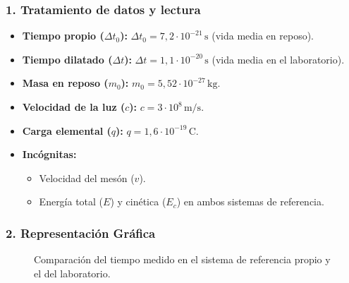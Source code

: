 \subsubsection*{1. Tratamiento de datos y lectura}
\begin{itemize}
    \item \textbf{Tiempo propio ($\Delta t_0$):} $\Delta t_0 = 7,2 \cdot 10^{-21} \, \text{s}$ (vida media en reposo).
    \item \textbf{Tiempo dilatado ($\Delta t$):} $\Delta t = 1,1 \cdot 10^{-20} \, \text{s}$ (vida media en el laboratorio).
    \item \textbf{Masa en reposo ($m_0$):} $m_0 = 5,52 \cdot 10^{-27} \, \text{kg}$.
    \item \textbf{Velocidad de la luz ($c$):} $c = 3 \cdot 10^8 \, \text{m/s}$.
    \item \textbf{Carga elemental ($q$):} $q = 1,6 \cdot 10^{-19} \, \text{C}$.
    \item \textbf{Incógnitas:}
    \begin{itemize}
        \item Velocidad del mesón ($v$).
        \item Energía total ($E$) y cinética ($E_c$) en ambos sistemas de referencia.
    \end{itemize}
\end{itemize}

\subsubsection*{2. Representación Gráfica}
\begin{figure}[H]
    \centering
    \caption{Comparación del tiempo medido en el sistema de referencia propio y el del laboratorio.}
\end{figure}

